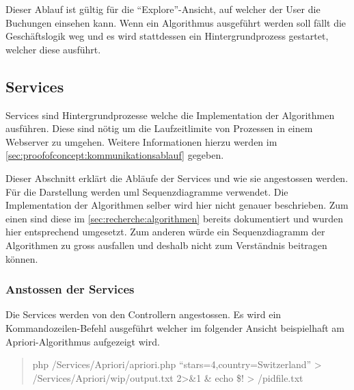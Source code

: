 Dieser Ablauf ist gültig für die "`Explore"'-Ansicht, auf welcher der User die Buchungen einsehen kann. Wenn ein Algorithmus ausgeführt werden soll fällt die Geschäftslogik weg und es wird stattdessen ein Hintergrundprozess gestartet, welcher diese ausführt.

\subsection{Services}
\label{sec:proofofconcept:architektur:services}
Services sind Hintergrundprozesse welche die Implementation der Algorithmen ausführen. Diese sind nötig um die Laufzeitlimite von Prozessen in einem Webserver zu umgehen. Weitere Informationen hierzu werden im \cref{sec:proofofconcept:kommunikationsablauf} gegeben.

Dieser Abschnitt erklärt die Abläufe der Services und wie sie angestossen werden. Für die Darstellung werden \gls{uml} Sequenzdiagramme verwendet. Die Implementation der Algorithmen selber wird hier nicht genauer beschrieben. Zum einen sind diese im \cref{sec:recherche:algorithmen} bereits dokumentiert und wurden hier entsprechend umgesetzt. Zum anderen würde ein Sequenzdiagramm der Algorithmen zu gross ausfallen und deshalb nicht zum Verständnis beitragen können.


\subsubsection{Anstossen der Services}
Die Services werden von den Controllern angestossen. Es wird ein Kommandozeilen-Befehl ausgeführt welcher im folgender Ansicht beispielhaft am Apriori-Algorithmus aufgezeigt wird.

\blockquote[]{
php /Services/Apriori/apriori.php ``stars=4,country=Switzerland'' > /Services/Apriori/wip/output.txt 2>\&1 \& echo \$! > /pidfile.txt
}

